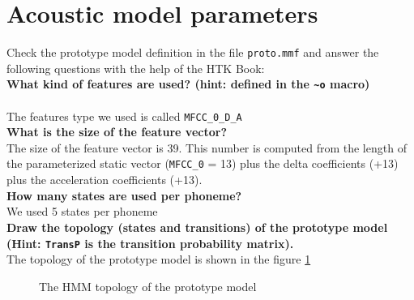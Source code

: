 \documentclass[onecolumn]{article}
\begin{document}
\section*{Acoustic model parameters}
Check the prototype model definition in the file \verb|proto.mmf| and answer the following questions with the help of the HTK Book:\\
\textbf{What kind of features are used? (hint: defined in the \verb|~o| macro)}\\
\\ The features type we used is called \verb|MFCC_0_D_A|
\\[6mm]
\textbf{What is the size of the feature vector?}\\[2mm]
The size of the feature vector is 39.
This number is computed from the length of the parameterized static vector (\verb|MFCC_0| = 13) plus the delta coefficients (+13) plus the acceleration coefficients (+13).
\\[4mm]
\noindent \textbf{How many states are used per phoneme?}
\\[2mm]
We used 5 states per phoneme\\[6mm]
\textbf{Draw the topology (states and transitions) of the prototype model (Hint: \verb|TransP| is the transition probability matrix).}
\\[2mm]
The topology of the prototype model is shown in the figure \ref{fig:HMM_topo}
\\[6mm]
\begin{figure}
    \centering
    \caption{The HMM topology of the prototype model}
    \label{fig:HMM_topo}
\end{figure}
\end{document}
